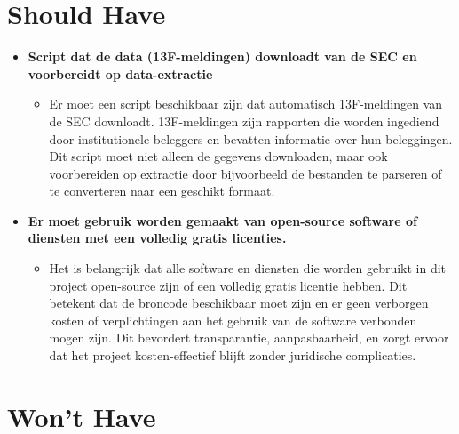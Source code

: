 \section{Should Have}

\begin{itemize}
    \item \textbf{Script dat de data (13F-meldingen) downloadt van de SEC en voorbereidt op data-extractie}
    \begin{itemize}
        \item Er moet een script beschikbaar zijn dat automatisch 13F-meldingen van de SEC downloadt. 13F-meldingen zijn rapporten die worden ingediend door institutionele beleggers en bevatten informatie over hun beleggingen. Dit script moet niet alleen de gegevens downloaden, maar ook voorbereiden op extractie door bijvoorbeeld de bestanden te parseren of te converteren naar een geschikt formaat.
    \end{itemize}
    
    
    \item \textbf{Er moet gebruik worden gemaakt van open-source software of diensten met een volledig gratis licenties.}
    \begin{itemize}
        \item Het is belangrijk dat alle software en diensten die worden gebruikt in dit project open-source zijn of een volledig gratis licentie hebben. Dit betekent dat de broncode beschikbaar moet zijn en er geen verborgen kosten of verplichtingen aan het gebruik van de software verbonden mogen zijn. Dit bevordert transparantie, aanpasbaarheid, en zorgt ervoor dat het project kosten-effectief blijft zonder juridische complicaties.
    \end{itemize}
\end{itemize}

\section{Won't Have}

